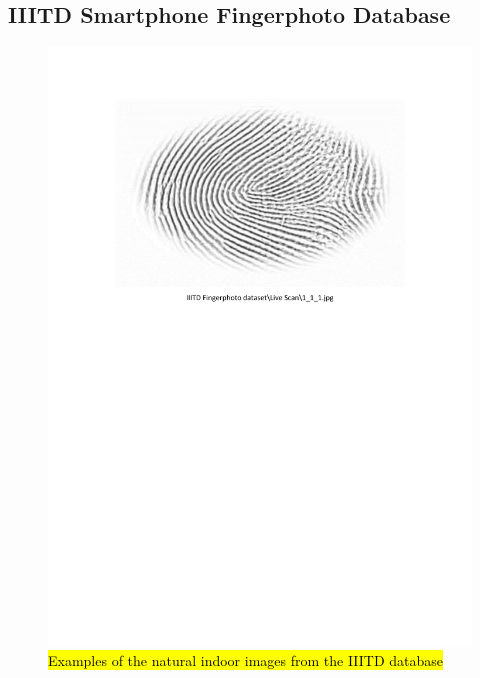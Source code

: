 \documentclass[review]{elsarticle}
\begin{document}
\subsection{IIITD Smartphone Fingerphoto Database}
		\begin{figure}[t]
			\centering
			\includegraphics[page=2,scale=.65,trim=2cm 15cm 2cm 2cm,clip]{IIITD_dataset.pdf}
			\caption{\hl{Examples of the natural indoor images from the IIITD database}}
			\label{fig:IIITD_Natural_Indoor}
		\end{figure}
\end{document}
